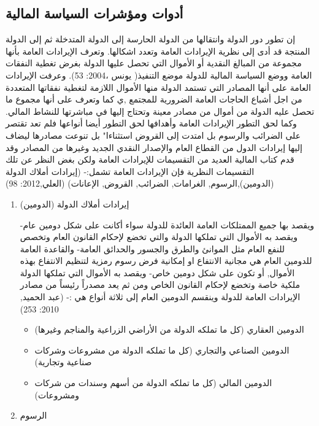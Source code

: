 \documentclass[10pt,a4paper]{report}
\begin{document}
\begin{doublespacing}
\subsection{أدوات ومؤشرات السياسة المالية}
     إن تطور دور الدولة وانتقالها من الدولة الحارسة إلى الدولة المتدخلة ثم إلى الدولة المنتجة قد أدى إلى نظرية الإيرادات العامة وتعدد اشكالها. وتعرف الإيرادات العامة بأنها مجموعة من المبالغ النقدية أو الأموال التي تحصل عليها الدولة بغرض تغطية النفقات العامة ووضع السياسة المالية للدولة موضع التنفيذ( يونس ،2004: 53). وعرفت الإيرادات العامة على أنها المصادر التي تستمد الدولة منها الأموال اللازمة لتغطية نفقاتها المتعددة من اجل أشباع الحاجات العامة الضرورية للمجتمع ,ي كما وتعرف على أنها مجموع ما تحصل عليه الدولة من أموال من مصادر معينة وتحتاج إليها في مباشرتها للنشاط المالي. وكما لحق التطور الإيرادات العامة وأهدافها لحق التطور أيضا أنواعها فلم تعد تقتصر على الضرائب والرسوم بل امتدت إلى القروض استثناءا" بل تنوعت مصادرها ليضاف إليها إيرادات الدول من القطاع العام والإصدار النقدي الجديد وغيرها من المصادر وقد قدم كتاب المالية العديد من التقسيمات للإيرادات العامة ولكن بغض النظر عن تلك التقسيمات النظرية فإن الإيرادات العامة تشمل:- (إيرادات أملاك الدولة (الدومين),الرسوم, الغرامات, الضرائب, القروض, الإعانات) (العلي,2012: 98)
\begin{enumerate}
	\item إيرادات أملاك الدولة (الدومين)
	
	     ويقصد بها جميع الممتلكات العامة العائدة للدولة سواء أكانت على شكل دومين عام- ويقصد به الأموال التي تملكها الدولة والتي تخضع لإحكام القانون العام وتخصص للنفع العام مثل الموانئ والطرق والجسور والحدائق العامة- والقاعدة العامة للدومين العام هي مجانية الانتفاع او إمكانية فرض رسوم رمزية لتنظيم الانتفاع بهذه الأموال, أو تكون على شكل دومين خاص- ويقصد به الأموال التي تملكها الدولة ملكية خاصة وتخضع لإحكام القانون الخاص ومن ثم يعد مصدراً رئيساً من مصادر الإيرادات العامة للدولة وينقسم الدومين العام إلى ثلاثة أنواع هي :- (عبد الحميد, 2010: 253)
	     \begin{itemize}
	     	\item الدومين العقاري (كل ما تملكه الدولة من الأراضي الزراعية والمناجم وغيرها)
	     	\item الدومين الصناعي والتجاري (كل ما تملكه الدولة من مشروعات وشركات صناعية وتجارية)
            \item الدومين المالي (كل ما تملكه الدولة من أسهم وسندات من شركات ومشروعات)
	     \end{itemize}
	     \item الرسوم
	     

\end{enumerate}
\end{doublespacing}
\end{document}
